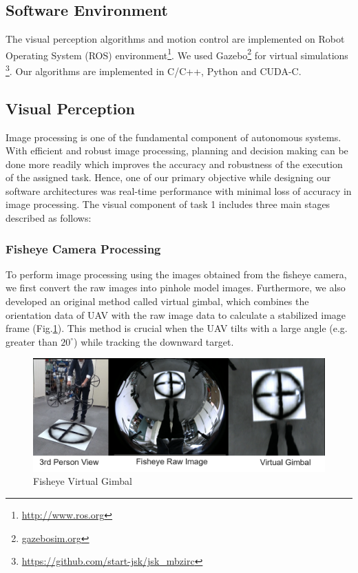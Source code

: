 \documentclass{standalone}
\begin{document}
\subsection{Software Environment}
The visual perception algorithms and motion control are implemented
on Robot Operating System (ROS) environment\footnote{\url{http://www.ros.org}}.
We used Gazebo\footnote{\url{gazebosim.org}} for virtual simulations
\footnote{\url{https://github.com/start-jsk/jsk_mbzirc}}. Our
algorithms are implemented in C/C++, Python and CUDA-C.


\subsection{Visual Perception}

Image processing is one of the fundamental component of autonomous
systems. With efficient and robust image processing, planning and
decision making can be done more readily which improves the accuracy
and robustness of the execution of the assigned task. Hence, one of our
primary objective while designing our software architectures was
real-time performance with minimal loss of accuracy in image processing. The visual
component of task 1 includes three main stages described as follows:

\subsubsection{Fisheye Camera Processing}
To perform image processing using the images obtained from the fisheye camera, we first convert the raw images into pinhole model images. Furthermore, we also developed an original method called virtual gimbal, which combines the orientation data of UAV with the raw image data to calculate a stabilized image frame (Fig.\ref{figure:fisheye-virtual-gimbal}). This method is crucial when the UAV tilts with a large angle (e.g. greater than $20^\circ$) while tracking the downward target.

\begin{figure}[h]
    \begin{center}
      \includegraphics[width=0.9\columnwidth]{sections/task1/images/fisheye_virtual_gimbal.png}
    \end{center}
    \caption{Fisheye Virtual Gimbal}
    \label{figure:fisheye-virtual-gimbal}
\end{figure}
\end{document}
